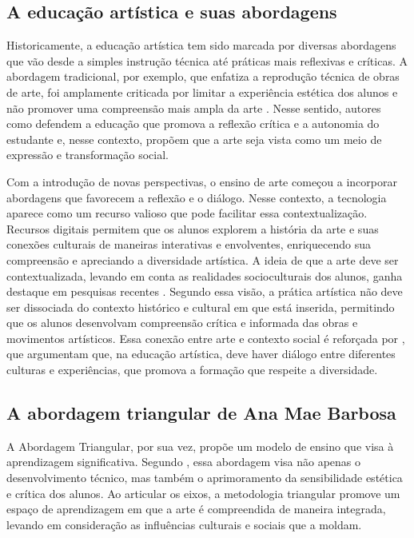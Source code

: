 \documentclass[portuguese]{textolivre}
\begin{document}
\subsection{A educação artística e suas abordagens}
Historicamente, a educação artística tem sido marcada por diversas abordagens que vão desde a simples instrução técnica até práticas mais reflexivas e críticas. A abordagem tradicional, por exemplo, que enfatiza a reprodução técnica de obras de arte, foi amplamente criticada por limitar a experiência estética dos alunos e não promover uma compreensão mais ampla da arte \cite{bourdieu1996distincao}. Nesse sentido, autores como \textcite{freire1996boprimido} defendem a educação que promova a reflexão crítica e a autonomia do estudante e, nesse contexto, propõem que a arte seja vista como um meio de expressão e transformação social.

Com a introdução de novas perspectivas, o ensino de arte começou a incorporar abordagens que favorecem a reflexão e o diálogo. Nesse contexto, a tecnologia aparece como um recurso valioso que pode facilitar essa contextualização. Recursos digitais permitem que os alunos explorem a história da arte e suas conexões culturais de maneiras interativas e envolventes, enriquecendo sua compreensão e apreciando a diversidade artística. A ideia de que a arte deve ser contextualizada, levando em conta as realidades socioculturais dos alunos, ganha destaque em pesquisas recentes \cite{hernandez2000educacao}. Segundo essa visão, a prática artística não deve ser dissociada do contexto histórico e cultural em que está inserida, permitindo que os alunos desenvolvam compreensão crítica e informada das obras e movimentos artísticos. Essa conexão entre arte e contexto social é reforçada por \textcite{lopes2013metodologias}, que argumentam que, na educação artística, deve haver diálogo entre diferentes culturas e experiências, que promova a formação que respeite a diversidade.

\subsection{A abordagem triangular de Ana Mae Barbosa}
A Abordagem Triangular, por sua vez, propõe um modelo de ensino que visa à aprendizagem significativa. Segundo \textcite{barbosa2010arte}, essa abordagem visa não apenas o desenvolvimento técnico, mas também o aprimoramento da sensibilidade estética e crítica dos alunos. Ao articular os eixos, a metodologia triangular promove um espaço de aprendizagem em que a arte é compreendida de maneira integrada, levando em consideração as influências culturais e sociais que a moldam.
\end{document}
